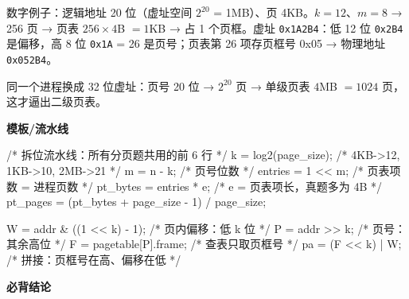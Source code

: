 \documentclass[10pt,a4paper]{ctexart}
\begin{document}

数字例子：逻辑地址 20 位（虚址空间 $2^{20}$ = 1MB）、页 4KB。$k=12$、$m=8$ → 256 页 → 页表 $256\times 4$B $=1$KB → 占 1 个页框。虚址 \texttt{0x1A2B4}：低 12 位 \texttt{0x2B4} 是偏移，高 8 位 \texttt{0x1A} = 26 是页号；页表第 26 项存页框号 0x05 → 物理地址 \texttt{0x052B4}。

同一个进程换成 32 位虚址：页号 20 位 → $2^{20}$ 页 → 单级页表 $4$MB $=1024$ 页，这才逼出二级页表。

\textbf{模板/流水线}

\begin{codebox}
/* 拆位流水线：所有分页题共用的前 6 行 */
k = log2(page_size);              /* 4KB->12, 1KB->10, 2MB->21 */
m = n - k;                        /* 页号位数 */
entries = 1 << m;                 /* 页表项数 = 进程页数 */
pt_bytes = entries * e;           /* e = 页表项长，真题多为 4B */
pt_pages = (pt_bytes + page_size - 1) / page_size;

W = addr & ((1 << k) - 1);        /* 页内偏移：低 k 位 */
P = addr >> k;                    /* 页号：其余高位 */
F = pagetable[P].frame;           /* 查表只取页框号 */
pa = (F << k) | W;                /* 拼接：页框号在高、偏移在低 */
\end{codebox}




\textbf{必背结论}
\end{document}
